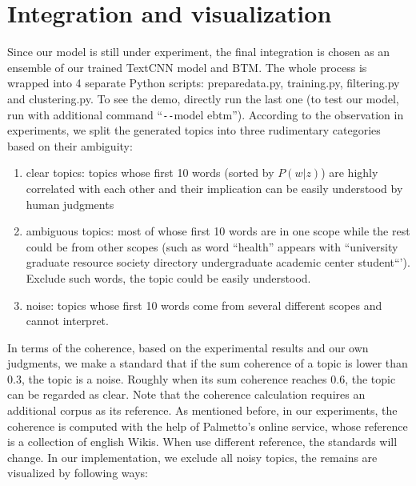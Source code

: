 \section{Integration and visualization}
Since our model is still under experiment, the final integration is chosen as an ensemble of our trained TextCNN model and BTM. The whole process is wrapped into 4 separate Python scripts: preparedata.py, training.py, filtering.py and clustering.py. To see the demo, directly run the last one (to test our model, run with additional command ``\verb|--|model ebtm''). According to the observation in experiments, we split the generated topics into three rudimentary categories based on their ambiguity:
\begin{enumerate}
    \item clear topics: topics whose first 10 words (sorted by $P(w|z)$) are highly correlated with each other and their implication can be easily understood by human judgments 
    \item ambiguous topics: most of whose first 10 words are in one scope while the rest could be from other scopes (such as word ``health'' appears with ``university  graduate  resource  society  directory   undergraduate  academic center student``'). Exclude such words, the topic could be easily understood.
    \item noise: topics whose first 10 words come from several different scopes and cannot interpret.
\end{enumerate}
In terms of the coherence, based on the experimental results and our own judgments, we make a standard that if the sum coherence of a topic is lower than 0.3, the topic is a noise. Roughly when its sum coherence reaches 0.6, the topic can be regarded as clear. Note that the coherence calculation requires an additional corpus as its reference. As mentioned before, in our experiments, the coherence is computed with the help of Palmetto's online service, whose reference is a collection of english Wikis. When use different reference, the standards will change. In our implementation, we exclude all noisy topics, the remains are visualized by following ways:
